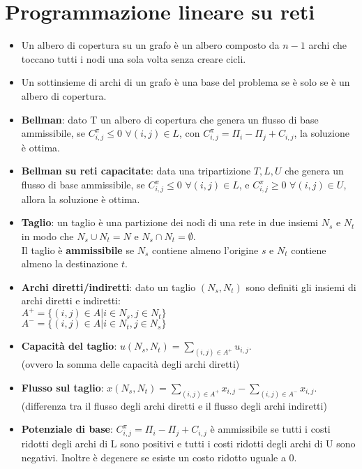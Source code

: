 \documentclass[fleqn,12pt]{article}
\begin{document}
\section{Programmazione lineare su reti}
\begin{itemize}
    \item Un albero di copertura su un grafo è un albero composto da $n-1$
        archi che toccano tutti i nodi una sola volta senza creare cicli.
    \item Un sottinsieme di archi di un grafo è una base del problema se è solo
        se è un albero di copertura.
    \item \textbf{Bellman}: dato T un albero di copertura che genera un flusso
        di base ammissibile, se $C_{i,j}^\pi \le 0 \,\, \forall (i,j) \in L$,
        con $C_{i,j}^\pi = \Pi_i-\Pi_j+C_{i,j}$, la soluzione è ottima.
    \item \textbf{Bellman su reti capacitate}: data una tripartizione $T, L, U$
        che genera un flusso di base ammissibile, se $C_{i,j}^\pi \le 0 \,\,
        \forall (i,j) \in L$, e $C_{i,j}^\pi \ge 0 \,\,
        \forall (i,j) \in U$, allora la soluzione è ottima.
    \item \textbf{Taglio}: un taglio è una partizione dei nodi di una rete in
        due insiemi $N_s$ e $N_t$ in modo che $N_s \cup N_t = N$ e $N_s \cap
        N_t = \emptyset$. \\
        Il taglio è \textbf{ammissibile} se $N_s$ contiene almeno l'origine $s$
        e $N_t$ contiene almeno la destinazione $t$.
    \item \textbf{Archi diretti/indiretti}: dato un taglio $(N_s, N_t)$ sono
        definiti gli insiemi di archi diretti e indiretti: \\
        $A^+ = \{(i,j) \in A | i \in N_s, j \in N_t\}$ \\
        $A^- = \{(i,j) \in A | i \in N_t, j \in N_s\}$
    \item \textbf{Capacità del taglio}: $u(N_s, N_t) = \sum\limits_{(i,j) \in
        A^+} u_{i,j}$. \\
        (ovvero la somma delle capacità degli archi diretti)
    \item \textbf{Flusso sul taglio}: $x(N_s, N_t) = \sum\limits_{(i,j) \in
        A^+} x_{i,j} - \sum\limits_{(i,j) \in A^-} x_{i,j}$. \\
        (differenza tra il flusso degli archi diretti e il flusso degli archi
        indiretti)
    \item \textbf{Potenziale di base}: $C_{i,j}^\pi = \Pi_i - \Pi_j + C_{i,j}$
        è ammissibile se tutti i costi ridotti degli archi di L sono positivi e
        tutti i costi ridotti degli archi di U sono negativi. Inoltre è
        degenere se esiste un costo ridotto uguale a 0.
\end{itemize}
\end{document}
